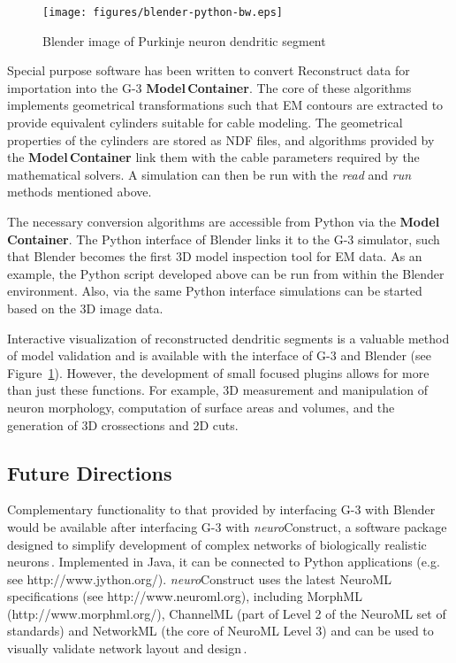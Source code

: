\documentclass[12pt]{article}
\begin{document}
\begin{figure}[ht]
  \centering
    \texttt{[image: figures/blender-python-bw.eps]}
  \caption{Blender image of Purkinje neuron dendritic segment}
  \label{fig:cbi-blender}
\end{figure}


Special purpose software has been written to convert Reconstruct data
for importation into the G-3 {\bf Model\,Container}.  The core of these
algorithms implements geometrical transformations such that EM
contours are extracted to provide equivalent cylinders suitable for
cable modeling.  The geometrical properties of the cylinders are
stored as NDF files, and algorithms provided by the {\bf Model\,Container}
link them with the cable parameters required by the mathematical
solvers.  A simulation can then be run with the {\it read} and {\it
  run} methods mentioned above.

The necessary conversion algorithms are accessible from Python via the
{\bf Model\,Container}.  The Python interface of Blender links it to the G-3
simulator, such that Blender becomes the first 3D model inspection
tool for EM data.  As an example, the Python script developed above
can be run from within the Blender environment.  Also, via the same
Python interface simulations can be started based on the 3D image
data.

Interactive visualization of reconstructed dendritic segments is a
valuable method of model validation and is available with the
interface of G-3 and Blender (see Figure~\ref{fig:cbi-blender}).
However, the development of small focused plugins allows for more than
just these functions. For example, 3D measurement and manipulation of
neuron morphology, computation of surface areas and volumes, and the
generation of 3D crossections and 2D cuts.

\subsection{Future Directions}
Complementary functionality to that provided by interfacing G-3 with
Blender would be available after interfacing G-3 with {\it
  neuro}Construct, a software package designed to simplify development
of complex networks of biologically realistic
neurons\,\cite{gleeson05:_build_networ_model}.  Implemented in Java,
it can be connected to Python applications (e.g. see
http://www.jython.org/).  {\it neuro}Construct uses the latest NeuroML
specifications (see http://www.neuroml.org), including MorphML
(http://www.morphml.org/), ChannelML (part of Level 2 of the NeuroML
set of standards) and NetworkML (the core of NeuroML Level 3) and can
be used to visually validate network layout and
design\,\cite{crook07:_morph}.
\end{document}
